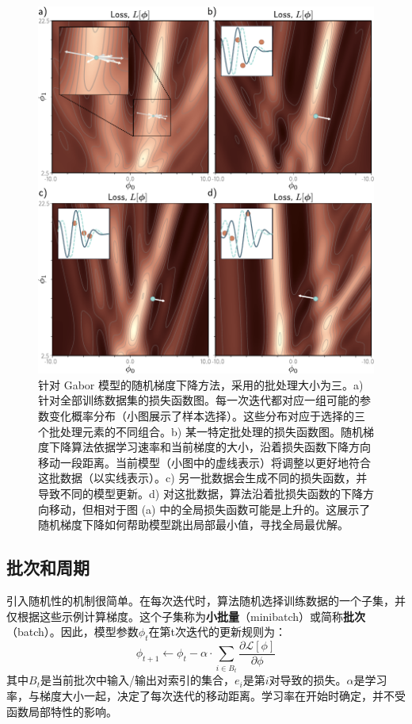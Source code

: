 \documentclass[lang=cn,newtx,10pt,scheme=chinese]{elegantbook}
\begin{document}
\begin{figure}[ht!]
\centering
\includegraphics[width=0.7\linewidth]{PDFFigures/UDLChap6PDF/TrainGaborSGDIter.pdf}
\caption{针对 Gabor 模型的随机梯度下降方法，采用的批处理大小为三。a) 针对全部训练数据集的损失函数图。每一次迭代都对应一组可能的参数变化概率分布（小图展示了样本选择）。这些分布对应于选择的三个批处理元素的不同组合。b) 某一特定批处理的损失函数图。随机梯度下降算法依据学习速率和当前梯度的大小，沿着损失函数下降方向移动一段距离。当前模型（小图中的虚线表示）将调整以更好地符合这批数据（以实线表示）。c) 另一批数据会生成不同的损失函数，并导致不同的模型更新。d) 对这批数据，算法沿着批损失函数的下降方向移动，但相对于图 (a) 中的全局损失函数可能是上升的。这展示了随机梯度下降如何帮助模型跳出局部最小值，寻找全局最优解。}
\end{figure}

\subsection{批次和周期}
引入随机性的机制很简单。在每次迭代时，算法随机选择训练数据的一个子集，并仅根据这些示例计算梯度。这个子集称为\textbf{小批量}（minibatch）或简称\textbf{批次}（batch）。因此，模型参数\(\phi_t\)在第t次迭代的更新规则为：
\begin{equation}
\phi_{t+1} \leftarrow \phi_t - \alpha \cdot \sum_{i \in B_t} \frac{\partial \mathcal{L}[\phi]}{\partial \phi} 
\end{equation}
其中\(B_t\)是当前批次中输入/输出对索引的集合，\(e_i\)是第\(i\)对导致的损失。\(\alpha\)是学习率，与梯度大小一起，决定了每次迭代的移动距离。学习率在开始时确定，并不受函数局部特性的影响。
\end{document}
